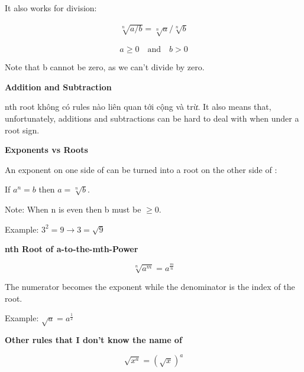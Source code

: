 \vspace{7 mm}

It also works for division:

\begin{equation}
  \begin{aligned}
    \sqrt[n]{a/b}=\sqrt[n]{a}/\sqrt[n]{b}
  \end{aligned}
\end{equation}

\[a \geq 0 \quad \text{and} \quad b > 0\]

Note that b cannot be zero, as we can't divide by zero.

\textbf{Addition and Subtraction}

nth root không có rules nào liên quan tới cộng và trừ. It also means that, unfortunately, additions and subtractions can be hard to deal with when under a root sign.

\textbf{Exponents vs Roots}

An exponent on one side of \q{=} can be turned into a root on the other side of \q{=}:

If \(a^{n}=b\) then \(a=\sqrt[n]{b}\).

Note: When n is even then b must be \(\geq 0\).

Example: $3^{2}=9 \rightarrow 3=\sqrt{9}$



\vspace{5 mm}

\textbf{nth Root of a-to-the-mth-Power}

\[\sqrt[n]{a^{m}}=a^{\frac{m}{n}}\]

The numerator becomes the exponent while the denominator is the index of the root.

Example: $\sqrt{a}=a^{\frac{1}{2}}$

\vspace{5 mm}

\textbf{Other rules that I don't know the name of}

\[\sqrt{x^{a}}= \left( \sqrt{x} \right)^{a}\]

